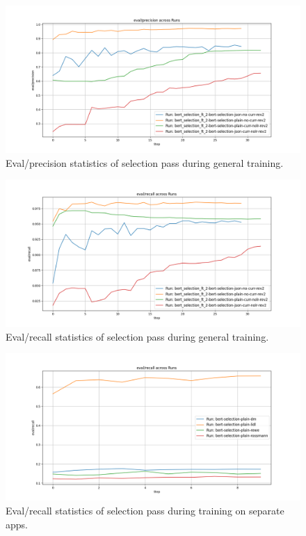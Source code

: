 \documentclass[licencjacka,en]{pracamgr}
\begin{document}
\begin{figure}[htbp]
    \centering
    \includegraphics[width=0.8\linewidth]{bachelor_images/bert_ft/s_epg.png}
    \caption{Eval/precision statistics of selection pass during general training.}
    \label{fig:s_epg}
\end{figure}

\begin{figure}[htbp]
    \centering
    \includegraphics[width=0.8\linewidth]{bachelor_images/bert_ft/s_erg.png}
    \caption{Eval/recall statistics of selection pass during general training.}
    \label{fig:s_erg}
\end{figure}

\begin{figure}[htbp]
    \centering
    \includegraphics[width=0.8\linewidth]{bachelor_images/bert_ft/s_ers.png}
    \caption{Eval/recall statistics of selection pass during training on separate apps.}
    \label{fig:s_ers}
\end{figure}
\end{document}
